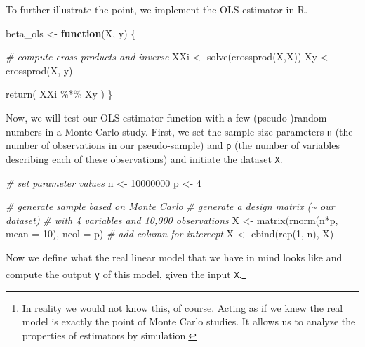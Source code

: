 \documentclass[
  12pt,
]{style/krantz}
\newenvironment{Shaded}{\begin{snugshade}}{\end{snugshade}}
\newcommand{\AttributeTok}[1]{\textcolor[rgb]{0.77,0.63,0.00}{#1}}
\newcommand{\CommentTok}[1]{\textcolor[rgb]{0.56,0.35,0.01}{\textit{#1}}}
\newcommand{\ControlFlowTok}[1]{\textcolor[rgb]{0.13,0.29,0.53}{\textbf{#1}}}
\newcommand{\DecValTok}[1]{\textcolor[rgb]{0.00,0.00,0.81}{#1}}
\newcommand{\FunctionTok}[1]{\textcolor[rgb]{0.00,0.00,0.00}{#1}}
\newcommand{\NormalTok}[1]{#1}
\newcommand{\OtherTok}[1]{\textcolor[rgb]{0.56,0.35,0.01}{#1}}
\newcommand{\SpecialCharTok}[1]{\textcolor[rgb]{0.00,0.00,0.00}{#1}}
\begin{document}
To further illustrate the point, we implement the OLS estimator in R.

\begin{Shaded}
\begin{Highlighting}[]
\NormalTok{beta\_ols }\OtherTok{\textless{}{-}} 
     \ControlFlowTok{function}\NormalTok{(X, y) \{}
          
          \CommentTok{\# compute cross products and inverse}
\NormalTok{          XXi }\OtherTok{\textless{}{-}} \FunctionTok{solve}\NormalTok{(}\FunctionTok{crossprod}\NormalTok{(X,X))}
\NormalTok{          Xy }\OtherTok{\textless{}{-}} \FunctionTok{crossprod}\NormalTok{(X, y) }
          
          \FunctionTok{return}\NormalTok{( XXi  }\SpecialCharTok{\%*\%}\NormalTok{ Xy )}
\NormalTok{     \}}
\end{Highlighting}
\end{Shaded}

Now, we will test our OLS estimator function with a few (pseudo-)random numbers in a Monte Carlo study. First, we set the sample size parameters \texttt{n} (the number of observations in our pseudo-sample) and \texttt{p} (the number of variables describing each of these observations) and initiate the dataset \texttt{X}.

\begin{Shaded}
\begin{Highlighting}[]
\CommentTok{\# set parameter values}
\NormalTok{n }\OtherTok{\textless{}{-}} \DecValTok{10000000}
\NormalTok{p }\OtherTok{\textless{}{-}} \DecValTok{4} 

\CommentTok{\# generate sample based on Monte Carlo}
\CommentTok{\# generate a design matrix (\textasciitilde{} our \textquotesingle{}dataset\textquotesingle{}) }
\CommentTok{\# with 4 variables and 10,000 observations}
\NormalTok{X }\OtherTok{\textless{}{-}} \FunctionTok{matrix}\NormalTok{(}\FunctionTok{rnorm}\NormalTok{(n}\SpecialCharTok{*}\NormalTok{p, }\AttributeTok{mean =} \DecValTok{10}\NormalTok{), }\AttributeTok{ncol =}\NormalTok{ p)}
\CommentTok{\# add column for intercept}
\NormalTok{X }\OtherTok{\textless{}{-}} \FunctionTok{cbind}\NormalTok{(}\FunctionTok{rep}\NormalTok{(}\DecValTok{1}\NormalTok{, n), X)}
\end{Highlighting}
\end{Shaded}

Now we define what the real linear model that we have in mind looks like and compute the output \texttt{y} of this model, given the input \texttt{X}.\footnote{In reality we would not know this, of course. Acting as if we knew the real model is exactly the point of Monte Carlo studies. It allows us to analyze the properties of estimators by simulation.}
\end{document}
